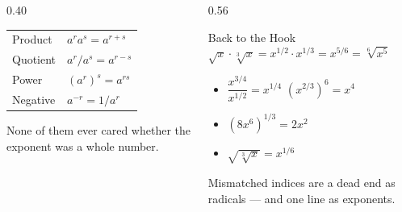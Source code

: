 \documentclass[aspectratio=169, 11pt]{beamer}
\begin{document}
\begin{frame}[t, plain]
  \begin{columns}[T]
    \begin{column}{0.40\textwidth}
      \footnotesize
      \begin{tabular}{ll}
      \hline
      Product & $a^{r}a^{s}=a^{r+s}$ \\
      Quotient & $a^{r}/a^{s}=a^{r-s}$ \\
      Power & $\left(a^{r}\right)^{s}=a^{rs}$ \\
      Negative & $a^{-r}=1/a^{r}$ \\
      \hline
      \end{tabular}
      \vspace{5pt}

      {\footnotesize None of them ever cared whether the exponent was a whole number.}
    \end{column}
    \begin{column}{0.56\textwidth}
      \begin{block}{Back to the Hook}
        \centering
        $\displaystyle \sqrt{x}\cdot\sqrt[3]{x} = x^{1/2}\cdot x^{1/3} = x^{5/6} = \sqrt[6]{x^{5}}$
      \end{block}
      \vspace{3pt}
      \footnotesize
      \begin{itemize}\setlength{\itemsep}{3pt}
        \item $\dfrac{x^{3/4}}{x^{1/2}} = x^{1/4}$ \qquad $\left(x^{2/3}\right)^{6} = x^{4}$
        \item $\left(8x^{6}\right)^{1/3} = 2x^{2}$
        \item $\sqrt{\sqrt[3]{x}} = x^{1/6}$ 
      \end{itemize}
      \vspace{2pt}
      {\footnotesize Mismatched indices are a dead end as radicals --- and one line as exponents.}
    \end{column}
  \end{columns}
\end{frame}
\end{document}
